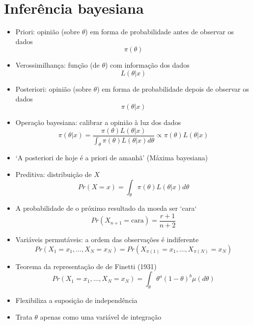 \documentclass{beamer}
\begin{document}
\section{Inferência bayesiana}
\begin{frame}{\secname}
    \begin{itemize}
    \item Priori: opinião (sobre $\theta$) em forma de probabilidade antes de observar os dados \[ \pi(\theta) \]
    \pause
    \item Verossimilhança: função (de $\theta$) com informação dos dados \[ L(\theta|x) \]
    \pause
    \item Posteriori: opinião (sobre $\theta$) em forma de probabilidade depois de observar os dados \[ \pi(\theta|x) \]
    \end{itemize}
\end{frame}

\begin{frame}{\secname}
    \begin{itemize}
    \item Operação bayesiana: calibrar a opinião à luz dos dados \[ \pi(\theta|x) = \frac{\pi(\theta) L(\theta|x)}{\int_{\theta} \pi(\theta) L(\theta|x) d\theta} \propto \pi(\theta) L(\theta|x) \]
    \pause
    \item `A posteriori de hoje é a priori de amanhã' (Máxima bayesiana)
    \pause
    \item Preditiva: distribuição de $X$ \[ Pr(X=x) = \int_{\theta} \pi(\theta) L(\theta|x) d\theta \]
    \pause
    \item A probabilidade de o próximo resultado da moeda ser `cara` \[ Pr(X_{n+1}=\textrm{cara}) = \frac{r+1}{n+2} \]
    \end{itemize}
\end{frame}

\begin{frame}{\secname}
    \begin{itemize}
    \item Variáveis permutáveis: a ordem das observações é indiferente \[ Pr(X_1=x_1, \ldots, X_N=x_N) = Pr(X_{\pi(1)}=x_1, \ldots, X_{\pi(N)}=x_N)  \]
    \pause
    \item Teorema da representação de de Finetti (1931) \[ Pr(X_1=x_1, \ldots, X_N=x_N) = \int_{\theta} \theta^a (1-\theta)^b \mu(d\theta) \]
    \pause
    \item Flexibiliza a suposição de independência
    \pause
    \item Trata $\theta$ apenas como uma variável de integração
    \end{itemize}
\end{frame}
\end{document}
